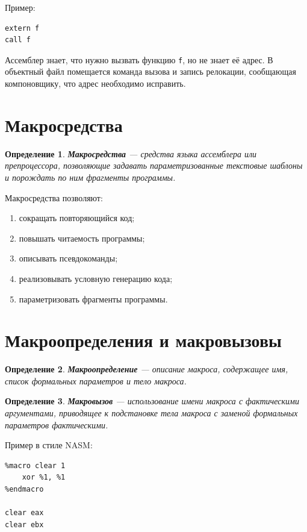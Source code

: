 \documentclass[12pt,a4paper]{article}
\newtheorem{definition}{Определение}
\begin{document}
Пример:

\begin{lstlisting}
extern f
call f
\end{lstlisting}

Ассемблер знает, что нужно вызвать функцию \texttt{f}, но не знает её адрес. В объектный файл помещается команда вызова и запись релокации, сообщающая компоновщику, что адрес необходимо исправить.

\section{Макросредства}

\begin{definition}
\textbf{Макросредства} --- средства языка ассемблера или препроцессора, позволяющие задавать параметризованные текстовые шаблоны и порождать по ним фрагменты программы.
\end{definition}

Макросредства позволяют:

\begin{enumerate}
    \item сокращать повторяющийся код;
    \item повышать читаемость программы;
    \item описывать псевдокоманды;
    \item реализовывать условную генерацию кода;
    \item параметризовать фрагменты программы.
\end{enumerate}

\section{Макроопределения и макровызовы}

\begin{definition}
\textbf{Макроопределение} --- описание макроса, содержащее имя, список формальных параметров и тело макроса.
\end{definition}

\begin{definition}
\textbf{Макровызов} --- использование имени макроса с фактическими аргументами, приводящее к подстановке тела макроса с заменой формальных параметров фактическими.
\end{definition}

Пример в стиле NASM:

\begin{lstlisting}
%macro clear 1
    xor %1, %1
%endmacro

clear eax
clear ebx
\end{lstlisting}
\end{document}
